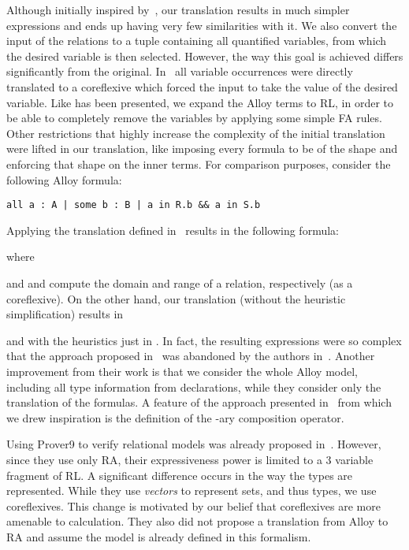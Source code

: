 \documentclass{llncs}
\begin{document}
Although initially inspired by~\cite{eqalloy}, our translation results
in much simpler expressions and ends up having very few similarities
with it. We also convert the input of the relations to a tuple
containing all quantified variables, from which the desired variable
is then selected. However, the way this goal is achieved differs
significantly from the original. In~\cite{eqalloy} all variable
occurrences were directly translated to a coreflexive which forced
the input to take the value of the desired variable. Like has been
presented, we expand the Alloy terms to RL, in order to be able to
completely remove the variables by applying some simple FA rules. Other
restrictions that highly increase the complexity of the initial
translation were lifted in our translation, like imposing every
formula to be of the shape  and enforcing that shape on the
inner terms. For comparison purposes, consider the following Alloy
formula:
\begin{center}
\verb+all a : A | some b : B | a in R.b && a in S.b+
\end{center}
Applying the translation defined in~\cite{eqalloy} results in the following formula:

where

and  and  compute the domain and range of a relation,
respectively (as a coreflexive).  On the other hand, our translation (without the
heuristic simplification) results in

and with the heuristics just in .
In fact, the resulting expressions were so complex that the approach
proposed in~\cite{eqalloy} was abandoned by the authors
in~\cite{dynamite}. Another improvement from their work is that we
consider the whole Alloy model, including all type information from
declarations, while they consider only the translation of the
formulas. A feature of the approach presented in~\cite{friasall2} from which we
drew inspiration is the definition of the -ary composition
operator.

Using Prover9 to verify relational models was already proposed in~\cite{crp9}. However, since they use only RA, their expressiveness power is limited to a 3 variable fragment of RL. A significant difference occurs in the way the types are represented. While they use \emph{vectors} to represent sets, and thus types, we use coreflexives. This change is motivated by our belief that coreflexives are more amenable to calculation. They also did not propose a translation from Alloy to RA and assume the model is already defined in this formalism. 
\end{document}
